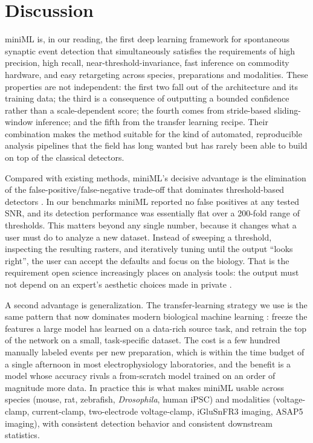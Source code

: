 \documentclass[11pt]{article}
\begin{document}
\section{Discussion}

miniML is, in our reading, the first deep learning framework for spontaneous
synaptic event detection that simultaneously satisfies the requirements of
high precision, high recall, near-threshold-invariance, fast inference on
commodity hardware, and easy retargeting across species, preparations and
modalities. These properties are not independent: the first two fall out of
the architecture and its training data; the third is a consequence of
outputting a bounded confidence rather than a scale-dependent score; the
fourth comes from stride-based sliding-window inference; and the fifth
from the transfer learning recipe. Their combination makes the method
suitable for the kind of automated, reproducible analysis pipelines that the
field has long wanted but has rarely been able to build on top of the
classical detectors.

Compared with existing methods, miniML's decisive advantage is the
elimination of the false-positive/false-negative trade-off that dominates
threshold-based detectors
\citep{clements1997detection, pernia2012deconvolution, merel2016bayesian,
mori2024simplyfire}. In our benchmarks miniML reported no false positives at
any tested SNR, and its detection performance was essentially flat over a
200-fold range of thresholds. This matters beyond any single number, because
it changes what a user must do to analyze a new dataset. Instead of sweeping
a threshold, inspecting the resulting rasters, and iteratively tuning until
the output ``looks right'', the user can accept the defaults and focus on
the biology. That is the requirement open science increasingly places on
analysis tools: the output must not depend on an expert's aesthetic choices
made in private \citep{huganir2013ampars, kavalali2015mechanisms}.

A second advantage is generalization. The transfer-learning strategy we use
is the same pattern that now dominates modern biological machine learning
\citep{yosinski2014transferable, theodoris2023transfer}: freeze the features
a large model has learned on a data-rich source task, and retrain the top of
the network on a small, task-specific dataset. The cost is a few hundred
manually labeled events per new preparation, which is within the time
budget of a single afternoon in most electrophysiology laboratories, and
the benefit is a model whose accuracy rivals a from-scratch model trained on
an order of magnitude more data. In practice this is what makes miniML
usable across species (mouse, rat, zebrafish, \textit{Drosophila}, human
iPSC) and modalities (voltage-clamp, current-clamp, two-electrode
voltage-clamp, iGluSnFR3 imaging, ASAP5 imaging), with consistent detection
behavior and consistent downstream statistics.
\end{document}
